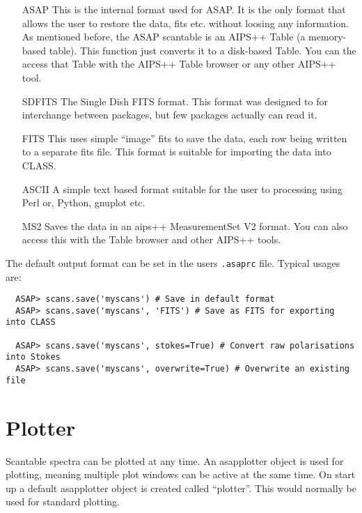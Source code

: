 \documentclass[11pt]{article}
\begin{document}
\begin{itemize}
\item[ASAP] This is the internal format used for ASAP. It is the only
  format that allows the user to restore the data, fits etc. without
  loosing any information.  As mentioned before, the ASAP scantable is
  an AIPS++ Table (a memory-based table).  This function just converts
  it to a disk-based Table.  You can the access that Table with the
  AIPS++ Table browser or any other AIPS++ tool.

\item[SDFITS] The Single Dish FITS format. This format was designed to
  for interchange between packages, but few packages actually can read
  it.

\item[FITS] This uses simple ``image'' fits to save the data, each row
  being written to a separate fits file. This format is suitable for
  importing the data into CLASS.

\item[ASCII] A simple text based format suitable for the user to
processing using Perl or, Python, gnuplot etc.

\item[MS2] Saves the data in an aips++ MeasurementSet V2 format.
You can also access this with the Table browser and other AIPS++
tools.

\end{itemize}

The default output format can be set in the users {\tt .asaprc} file.
Typical usages are:

\begin{verbatim}
  ASAP> scans.save('myscans') # Save in default format
  ASAP> scans.save('myscans', 'FITS') # Save as FITS for exporting into CLASS

  ASAP> scans.save('myscans', stokes=True) # Convert raw polarisations into Stokes
  ASAP> scans.save('myscans', overwrite=True) # Overwrite an existing file
\end{verbatim}


\section{Plotter}

Scantable spectra can be plotted at any time. An asapplotter object is
used for plotting, meaning multiple plot windows can be active at the
same time. On start up a default asapplotter object is created called
``plotter''. This would normally be used for standard plotting.
\end{document}
